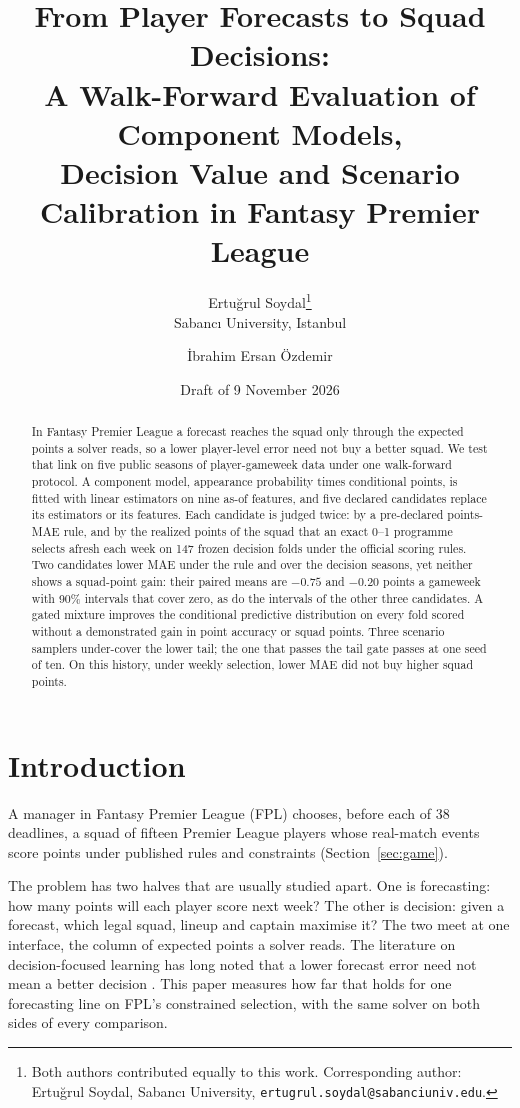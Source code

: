 \documentclass[11pt,a4paper]{article}
\title{From Player Forecasts to Squad Decisions:\\
A Walk-Forward Evaluation of Component Models,\\
Decision Value and Scenario Calibration in Fantasy Premier League}
\author{Ertuğrul Soydal\thanks{Both authors contributed equally to this work. Corresponding author: Ertuğrul Soydal, Sabancı University, \texttt{ertugrul.soydal@sabanciuniv.edu}.}\\
Sabancı University, Istanbul
\and İbrahim Ersan Özdemir\footnotemark[1]}
\date{Draft of 9 November 2026}
\begin{document}
\maketitle

\begin{abstract}
In Fantasy Premier League a forecast reaches the squad only through the expected points a solver reads, so a lower player-level error need not buy a better squad. We test that link on five public seasons of player-gameweek data under one walk-forward protocol. A component model, appearance probability times conditional points, is fitted with linear estimators on nine as-of features, and five declared candidates replace its estimators or its features. Each candidate is judged twice: by a pre-declared points-MAE rule, and by the realized points of the squad that an exact 0--1 programme selects afresh each week on 147 frozen decision folds under the official scoring rules. Two candidates lower MAE under the rule and over the decision seasons, yet neither shows a squad-point gain: their paired means are $-0.75$ and $-0.20$ points a gameweek with 90\% intervals that cover zero, as do the intervals of the other three candidates. A gated mixture improves the conditional predictive distribution on every fold scored without a demonstrated gain in point accuracy or squad points. Three scenario samplers under-cover the lower tail; the one that passes the tail gate passes at one seed of ten. On this history, under weekly selection, lower MAE did not buy higher squad points.
\end{abstract}

\section{Introduction}

A manager in Fantasy Premier League (FPL) chooses, before each of 38 deadlines, a squad of fifteen Premier League players whose real-match events score points under published rules and constraints (Section~\ref{sec:game}).

The problem has two halves that are usually studied apart. One is forecasting: how many points will each player score next week? The other is decision: given a forecast, which legal squad, lineup and captain maximise it? The two meet at one interface, the column of expected points a solver reads. The literature on decision-focused learning has long noted that a lower forecast error need not mean a better decision \cite{elmachtoub2022}. This paper measures how far that holds for one forecasting line on FPL's constrained selection, with the same solver on both sides of every comparison.
\end{document}
